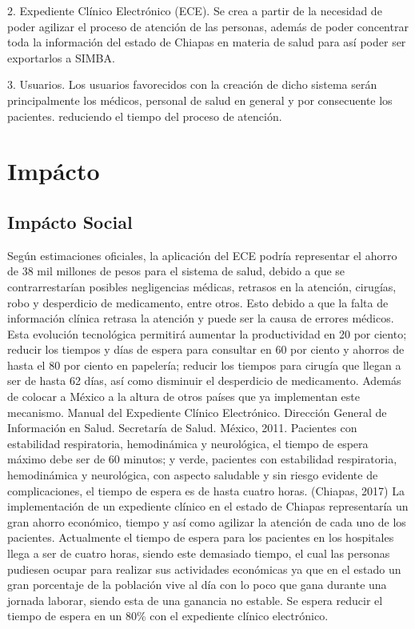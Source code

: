 2. Expediente Clínico Electrónico (ECE). Se crea a partir de la necesidad de poder agilizar el proceso de atención de las personas, además de poder concentrar toda la información del estado de Chiapas en materia de salud para así poder ser exportarlos a SIMBA.

3. Usuarios. Los usuarios favorecidos con la creación de dicho sistema serán principalmente los médicos, personal de salud en general y por consecuente los pacientes. reduciendo el tiempo del proceso de atención.


\section{Impácto}

\subsection{Impácto Social}

Según estimaciones oficiales, la aplicación del ECE podría representar el ahorro de 38 mil millones de pesos para el sistema de salud, debido a que se contrarrestarían posibles negligencias médicas, retrasos en la atención, cirugías, robo y desperdicio de medicamento, entre otros. Esto debido a que la falta de información clínica retrasa la atención y puede ser la causa de errores médicos. Esta evolución tecnológica permitirá aumentar la productividad en 20 por ciento; reducir los tiempos y días de espera para consultar en 60 por ciento y ahorros de hasta el 80 por ciento en papelería; reducir los tiempos para cirugía que llegan a ser de hasta 62 días, así como disminuir el desperdicio de medicamento. Además de colocar a México a la altura de otros países que ya implementan este mecanismo. Manual del Expediente Clínico Electrónico. Dirección General de Información en Salud. Secretaría de Salud. México, 2011.
Pacientes con estabilidad respiratoria, hemodinámica y neurológica, el tiempo de espera máximo debe ser de 60 minutos; y verde, pacientes con estabilidad respiratoria, hemodinámica y neurológica, con aspecto saludable y sin riesgo evidente de complicaciones, el tiempo de espera es de hasta cuatro horas. (Chiapas, 2017)
La implementación de un expediente clínico en el estado de Chiapas representaría un gran ahorro económico, tiempo y así como agilizar la atención de cada uno de los pacientes. Actualmente el tiempo de espera para los pacientes en los hospitales llega a ser de cuatro horas, siendo este demasiado tiempo, el cual las personas pudiesen ocupar para realizar sus actividades económicas ya que en el estado un gran porcentaje de la población vive al día con lo poco que gana durante una jornada laborar, siendo esta de una ganancia no estable. Se espera reducir el tiempo de espera en un 80\% con el expediente clínico electrónico.


